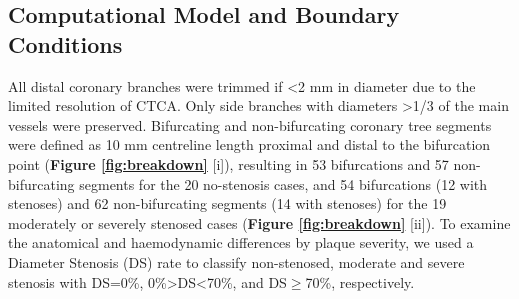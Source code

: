\documentclass[preprint,11pt,review]{elsarticle}
\begin{document}
\begin{table}
\centering
{}
\end{table}

\subsection{Computational Model and Boundary Conditions}

All distal coronary branches were trimmed if \textless2 mm in diameter due to the limited resolution of CTCA. Only side branches with diameters >1/3 of the main vessels were preserved. Bifurcating and non-bifurcating coronary tree segments were defined as 10 mm centreline length proximal and distal to the bifurcation point  \cite{Medrano-Gracia2016computational} (\textbf{Figure \ref{fig:breakdown}} [i]), resulting in 53 bifurcations and 57 non-bifurcating segments for the 20 no-stenosis cases, and 54 bifurcations (12 with stenoses) and 62 non-bifurcating segments (14 with stenoses) for the 19 moderately or severely stenosed cases (\textbf{Figure \ref{fig:breakdown}} [ii]). To examine the anatomical and haemodynamic differences by plaque severity, we used a Diameter Stenosis (DS) rate to classify non-stenosed, moderate and severe stenosis with DS=0\%, 0\%\textgreater DS\textless70\%, and DS$\geq$70\%, respectively. 
 
\end{document}
